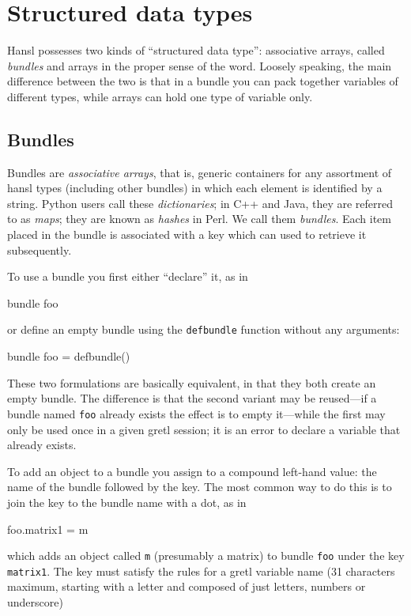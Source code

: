 \chapter{Structured data types}
\label{chap:structypes}

Hansl possesses two kinds of ``structured data type'': associative
arrays, called \emph{bundles} and arrays in the proper sense of the
word. Loosely speaking, the main difference between the two is that in
a bundle you can pack together variables of different types, while
arrays can hold one type of variable only.

\section{Bundles}
\label{sec:bundles}

Bundles are \emph{associative arrays}, that is, generic containers for
any assortment of hansl types (including other bundles) in which each
element is identified by a string. Python users call these
\emph{dictionaries}; in C++ and Java, they are referred to as
\emph{maps}; they are known as \emph{hashes} in Perl. We call them
\emph{bundles}. Each item placed in the bundle is associated with a
key which can used to retrieve it subsequently.

To use a bundle you first either ``declare'' it, as in
%
\begin{code}
bundle foo
\end{code}
%
or define an empty bundle using the \texttt{defbundle} function
without any arguments:
%
\begin{code}
bundle foo = defbundle()
\end{code}
%
These two formulations are basically equivalent, in that they both
create an empty bundle. The difference is that the second variant may
be reused---if a bundle named \texttt{foo} already exists the effect
is to empty it---while the first may only be used once in a given
gretl session; it is an error to declare a variable that already
exists.

To add an object to a bundle you assign to a compound left-hand value:
the name of the bundle followed by the key. The most common way to do
this is to join the key to the bundle name with a dot, as in
\begin{code}
  foo.matrix1 = m
\end{code}
which adds an object called \texttt{m} (presumably a matrix) to bundle
\texttt{foo} under the key \texttt{matrix1}. The key must satisfy the
rules for a gretl variable name (31 characters maximum, starting
with a letter and composed of just letters, numbers or underscore)

